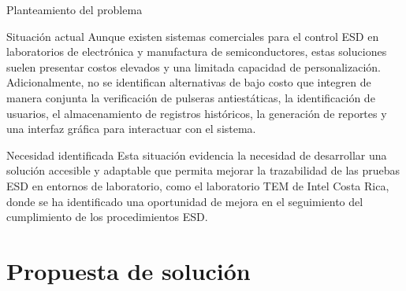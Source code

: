 \documentclass[aspectratio=169]{beamer}
\newcommand{\rightfootertext}{}
\newcommand{\setrightfooter}[1]{\gdef\rightfootertext{#1}}
\begin{document}
\begin{frame}{Planteamiento del problema}

    \begin{block}{Situación actual}
        \justifying
        Aunque existen sistemas comerciales para el control ESD en laboratorios de electrónica y
        manufactura de semiconductores, estas soluciones suelen presentar costos elevados y una
        limitada capacidad de personalización. Adicionalmente, no se identifican alternativas de
        bajo costo que integren de manera conjunta la verificación de pulseras antiestáticas, la
        identificación de usuarios, el almacenamiento de registros históricos, la generación de
        reportes y una interfaz gráfica para interactuar con el sistema.
    \end{block}

    \vspace{0.25cm}

    \begin{alertblock}{Necesidad identificada}
        \justifying
        Esta situación evidencia
        la necesidad de desarrollar una solución accesible y adaptable que permita mejorar la
        trazabilidad de las pruebas ESD en entornos de laboratorio, como el laboratorio TEM
        de Intel Costa Rica, donde se ha identificado una oportunidad de mejora en el seguimiento
        del cumplimiento de los procedimientos ESD.
    \end{alertblock}

\end{frame}


\setrightfooter{}
\section{Propuesta de solución}
\end{document}
